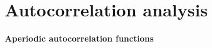 \documentclass[english,11pt]{article}
\newcommand{\1}{\mathbf{1}}
\newcommand{\TODO}[1]{{\color{red}{[#1]}}}
\numberwithin{equation}{section}
\theoremstyle{plain}
\theoremstyle{definition}
\theoremstyle{remark}
\theoremstyle{plain}
\theoremstyle{remark}
\theoremstyle{plain}
\theoremstyle{plain}
\newcommand{\SNR}{\ensuremath{\textsf{SNR}}}
\begin{document}
%
%


\section{Autocorrelation analysis}




\paragraph{Aperiodic autocorrelation functions}

\end{document}
